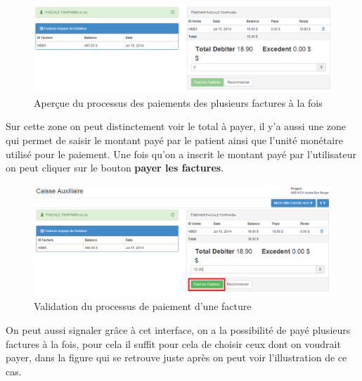 \documentclass[12pt,a4paper]{report}
\begin{document}
\begin{figure}[h]
\begin{center}
\includegraphics[width=14cm]{pic/PaidInvoice.png}
\end{center}
\caption{Aperçue du processus des paiements des plusieurs factures à la fois}
\label{Aperçue du processus des paiements des plusieurs factures à la fois}
\end{figure}

Sur cette zone on peut distinctement voir le total à payer, il y'a aussi une zone qui permet de saisir le montant payé par le patient ainsi que l'unité monétaire utilisé pour  le paiement. Une fois qu'on a inscrit le montant payé par l'utilisateur on peut cliquer sur le bouton \textbf{payer les factures}.

\begin{figure}[h]
\begin{center}
\includegraphics[width=12cm]{pic/PaidInvoiceOK.png}
\end{center}
\caption{Validation du processus de paiement d'une facture}
\label{Validation du processus de paiement d'une facture}
\end{figure}
\newpage
On peut aussi signaler grâce à cet interface, on a la possibilité de payé plusieurs factures à la fois, pour cela il suffit pour cela de choisir ceux dont on voudrait payer, dans la figure qui se retrouve juste après on peut voir l'illustration de ce cas.
\end{document}
